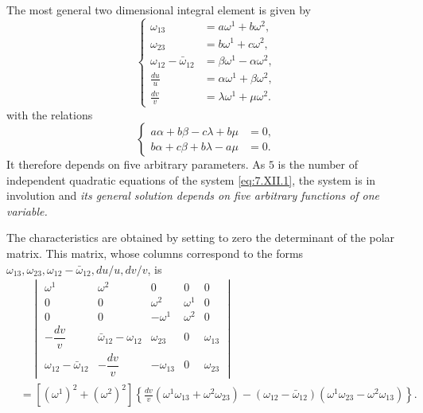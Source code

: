 \documentclass[leqno,11pt]{book}
\numberwithin{equation}{chapter}
\theoremstyle{shape1}
\theoremstyle{shape0}
\theoremstyle{shape2}
\theoremstyle{definition}
\begin{document}
The most general two dimensional integral element is given by
\begin{equation}
  \label{eq:7.XII.2}\tag{XII, 2}
  \left\{
    \begin{aligned}
      \omega_{13}&=a\omega^{1}+b\omega^{2},\\
      \omega_{23}&=b\omega^{1}+c\omega^{2},\\
      \omega_{12}-\bar\omega_{12}&=\beta\omega^{1}-\alpha\omega^{2},\\
      \frac{du}{u}&=\alpha\omega^{1}+\beta\omega^{2},\\
      \frac{dv}{v}&=\lambda\omega^{1}+\mu\omega^{2}.
    \end{aligned}
  \right.
\end{equation}
with the relations
\begin{equation}
  \label{eq:7.XII.3}\tag{XII, 3}
  \left\{
    \begin{aligned}
      a\alpha+b\beta-c\lambda+b\mu&=0,\\
      b\alpha+c\beta+b\lambda-a\mu&=0.
    \end{aligned}
  \right.
\end{equation}
It therefore depends on five arbitrary parameters. As $5$ is the number of independent quadratic equations of the system \eqref{eq:7.XII.1}, the system is in involution and \emph{its general solution depends on five arbitrary functions of one variable.}

The characteristics are obtained by setting to zero the determinant of the polar matrix. This matrix, whose columns correspond to the forms $\omega_{13},\omega_{23},\omega_{12}-\bar\omega_{12},du/u,dv/v$, is
\begin{align*}
  &\quad
  \begin{vmatrix}
    \omega^{1}&\omega^{2}&0&0&0\\
    0&0&\omega^{2}&\omega^{1}&0\\
    0&0&-\omega^{1}&\omega^{2}&0\\
    -\dfrac{dv}{v}&\bar\omega_{12}-\omega_{12}&\omega_{23}&0&\omega_{13}\\
    \omega_{12}-\bar\omega_{12}&-\dfrac{dv}{v}&-\omega_{13}&0&\omega_{23}
  \end{vmatrix}\\
&=[(\omega^{1})^{2}+(\omega^{2})^{2}]\left\{\frac{dv}{v}(\omega^{1}\omega_{13}+\omega^{2}\omega_{23})-(\omega_{12}-\bar\omega_{12})(\omega^{1}\omega_{23}-\omega^{2}\omega_{13})\right\}.
\end{align*}
\end{document}
